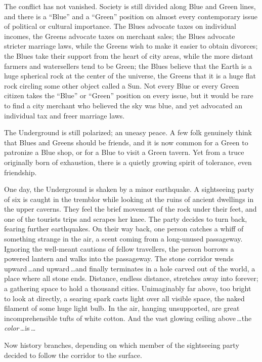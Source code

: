 {
 The conflict has not vanished. Society is still divided along Blue
and Green lines, and there is a
``Blue'' and a
``Green'' position on almost every
contemporary issue of political or cultural importance. The Blues
advocate taxes on individual incomes, the Greens advocate taxes on
merchant sales; the Blues advocate stricter marriage laws, while the
Greens wish to make it easier to obtain divorces; the Blues take their
support from the heart of city areas, while the more distant farmers
and watersellers tend to be Green; the Blues believe that the Earth is
a huge spherical rock at the center of the universe, the Greens that it
is a huge flat rock circling some other object called a Sun. Not every
Blue or every Green citizen takes the
``Blue'' or
``Green'' position on every issue,
but it would be rare to find a city merchant who believed the sky was
blue, and yet advocated an individual tax and freer marriage laws.}

{
 The Underground is still polarized; an uneasy peace. A few folk
genuinely think that Blues and Greens should be friends, and it is now
common for a Green to patronize a Blue shop, or for a Blue to visit a
Green tavern. Yet from a truce originally born of exhaustion, there is
a quietly growing spirit of tolerance, even friendship.}

{
 One day, the Underground is shaken by a minor earthquake. A
sightseeing party of six is caught in the tremblor while looking at the
ruins of ancient dwellings in the upper caverns. They feel the brief
movement of the rock under their feet, and one of the tourists trips
and scrapes her knee. The party decides to turn back, fearing further
earthquakes. On their way back, one person catches a whiff of something
strange in the air, a scent coming from a long-unused passageway.
Ignoring the well-meant cautions of fellow travellers, the person
borrows a powered lantern and walks into the passageway. The stone
corridor wends upward\,\ldots and upward\,\ldots and finally terminates in
a hole carved out of the world, a place where all stone ends. Distance,
endless distance, stretches away into forever; a gathering space to
hold a thousand cities. Unimaginably far above, too bright to look at
directly, a searing spark casts light over all visible space, the naked
filament of some huge light bulb. In the air, hanging unsupported, are
great incomprehensible tufts of white cotton. And the vast glowing
ceiling above\,\ldots the \textit{color}\,\ldots is\,\ldots}

{
 Now history branches, depending on which member of the sightseeing
party decided to follow the corridor to the surface.}

